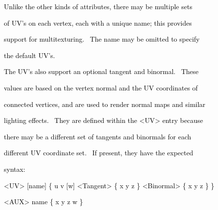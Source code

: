 \documentclass[a4paper]{article}
\newcommand\textstyleOOoComputerKeyWord[1]{\textrm{\textcolor[rgb]{0.0,0.0,0.5019608}{#1}}}
\begin{document}
\bigskip

{\color{black}
\textstyleOOoComputerKeyWord{\textcolor{black}{\ \ \ \ Unlike the other kinds of attributes, there may be multiple
sets}}}

{\color{black}
\textstyleOOoComputerKeyWord{\textcolor{black}{\ \ \ \ of UV's on each vertex, each with a unique name; this provides}}}

{\color{black}
\textstyleOOoComputerKeyWord{\textcolor{black}{\ \ \ \ support for multitexturing. \ The name may be omitted to
specify}}}

{\color{black}
\textstyleOOoComputerKeyWord{\textcolor{black}{\ \ \ \ the default UV's.}}}


\bigskip

{\color{black}
\textstyleOOoComputerKeyWord{\textcolor{black}{\ \ \ \ The UV's also support an optional tangent and binormal.
\ These}}}

{\color{black}
\textstyleOOoComputerKeyWord{\textcolor{black}{\ \ \ \ values are based on the vertex normal and the UV coordinates
of}}}

{\color{black}
\textstyleOOoComputerKeyWord{\textcolor{black}{\ \ \ \ connected vertices, and are used to render normal maps and
similar}}}

{\color{black}
\textstyleOOoComputerKeyWord{\textcolor{black}{\ \ \ \ lighting effects. \ They are defined within the
{\textless}UV{\textgreater} entry because}}}

{\color{black}
\textstyleOOoComputerKeyWord{\textcolor{black}{\ \ \ \ there may be a different set of tangents and binormals for
each}}}

{\color{black}
\textstyleOOoComputerKeyWord{\textcolor{black}{\ \ \ \ different UV coordinate set. \ If present, they have the
expected}}}

{\color{black}
\textstyleOOoComputerKeyWord{\textcolor{black}{\ \ \ \ syntax:}}}


\bigskip

{\color{black}
\textstyleOOoComputerKeyWord{\textcolor{black}{\ \ \ \ {\textless}UV{\textgreater} [name] \{ u v [w]
{\textless}Tangent{\textgreater} \{ x y z \} {\textless}Binormal{\textgreater} \{ x y z \} \}}}}


\bigskip


\bigskip

{\color{black}
\textstyleOOoComputerKeyWord{\textcolor{black}{\ \ \ \ {\textless}AUX{\textgreater} name \{ x y z w \}}}}


\bigskip
\end{document}
